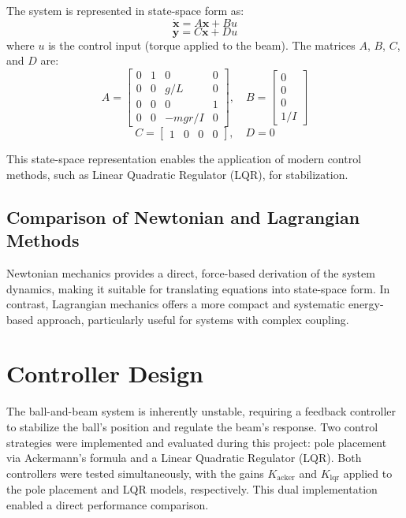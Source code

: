 \documentclass[conference]{IEEEtran}
\begin{document}
The system is represented in state-space form as:
\begin{equation}
\dot{\mathbf{x}} = A \mathbf{x} + B u
\end{equation}
\begin{equation}
\mathbf{y} = C \mathbf{x} + D u
\end{equation}
where \(u\) is the control input (torque applied to the beam). The matrices \(A\), \(B\), \(C\), and \(D\) are:
\[
A = \begin{bmatrix}
0 & 1 & 0 & 0 \\
0 & 0 & g/L & 0 \\
0 & 0 & 0 & 1 \\
0 & 0 & -m g r/I & 0
\end{bmatrix}, \quad
B = \begin{bmatrix}
0 \\ 0 \\ 0 \\ 1/I
\end{bmatrix}
\]
\[
C = \begin{bmatrix}
1 & 0 & 0 & 0
\end{bmatrix}, \quad
D = 0
\]

This state-space representation enables the application of modern control methods, such as Linear Quadratic Regulator (LQR), for stabilization.

\subsection{Comparison of Newtonian and Lagrangian Methods}
\label{subsec:model_comparison}
Newtonian mechanics provides a direct, force-based derivation of the system dynamics, making it suitable for translating equations into state-space form. In contrast, Lagrangian mechanics offers a more compact and systematic energy-based approach, particularly useful for systems with complex coupling.

\section{Controller Design}
\label{sec:control_design}
The ball-and-beam system is inherently unstable, requiring a feedback controller to stabilize the ball's position and regulate the beam's response. Two control strategies were implemented and evaluated during this project: pole placement via Ackermann's formula and a Linear Quadratic Regulator (LQR). Both controllers were tested simultaneously, with the gains \(K_{\text{acker}}\) and \(K_{\text{lqr}}\) applied to the pole placement and LQR models, respectively. This dual implementation enabled a direct performance comparison.
\end{document}
